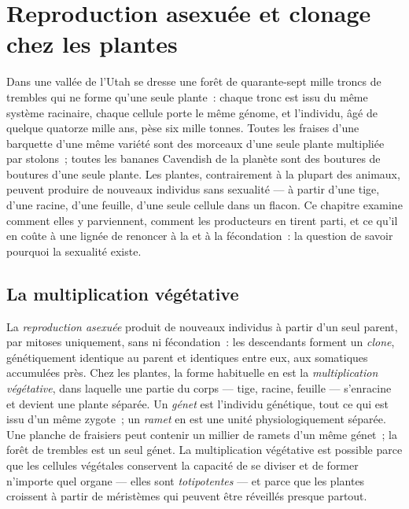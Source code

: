 \chapter{Reproduction asexuée et clonage chez les plantes}\label{ch:b2:asexual-reproduction}

Dans une vallée de l'Utah se dresse une forêt de quarante-sept mille
troncs de trembles qui ne forme qu'une seule plante~: chaque tronc est
issu du même système racinaire, chaque cellule porte le même génome, et
l'individu, âgé de quelque quatorze mille ans, pèse six mille tonnes.
Toutes les fraises d'une barquette d'une même variété sont des morceaux
d'une seule plante multipliée par stolons~; toutes les bananes Cavendish
de la planète sont des boutures de boutures d'une seule plante. Les
plantes, contrairement à la plupart des animaux, peuvent produire de
nouveaux individus sans sexualité --- à partir d'une tige, d'une racine,
d'une feuille, d'une seule cellule dans un flacon. Ce chapitre examine
comment elles y parviennent, comment les producteurs en tirent parti, et
ce qu'il en coûte à une lignée de renoncer à la  et à la
fécondation~: la question de savoir pourquoi la sexualité existe.

\section{La multiplication végétative}

\begin{definition}\label{def:b2:asexual-reproduction:clone}
La \emph{reproduction asexuée} produit de nouveaux individus à partir
d'un seul parent, par mitoses uniquement, sans  ni fécondation~:
les descendants forment un \emph{clone}, génétiquement identique au
parent et identiques entre eux, aux  somatiques accumulées
près. Chez les plantes, la forme habituelle en est la
\emph{multiplication végétative}, dans laquelle une partie du corps ---
tige, racine, feuille --- s'enracine et devient une plante séparée. Un
\emph{génet} est l'individu génétique, tout ce qui est issu d'un même
zygote~; un \emph{ramet} en est une unité physiologiquement séparée. Une
planche de fraisiers peut contenir un millier de ramets d'un même
génet~; la forêt de trembles est un seul génet. La multiplication
végétative est possible parce que les cellules végétales conservent la
capacité de se diviser et de former n'importe quel organe --- elles
sont \emph{totipotentes} --- et parce que les plantes croissent à partir
de méristèmes qui peuvent être réveillés presque partout.
\end{definition}

